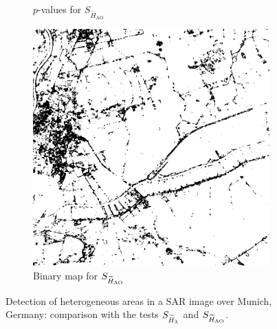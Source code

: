 \documentclass[
  journal,
]{IEEEtran}%
\begin{document}
\begin{figure}[hbt]
\begin{subfigure}{0.23\textwidth}
        \caption{$p$-values for $S_{\widetilde{H}_{\text{AO}}}$}
        \label{fig:2d}
    \end{subfigure}
    \begin{subfigure}{0.16\textwidth}
        \includegraphics[width=\linewidth]{./Figures/H_005_munich_sh_AO_L12.png}
        \caption{Binary map for $\small{S_{\widetilde{H}_{\text{AO}}}}$}
        \label{fig:2e}
    \end{subfigure}
    \caption{Detection of heterogeneous areas in a SAR image over Munich, Germany: comparison with the tests $\small{S_{\widetilde{H}_{\lambda}}}$ and $\small{S_{\widetilde{H}_{\text{AO}}}}$.}
    \label{fig:munich}
\end{figure}
\end{document}
